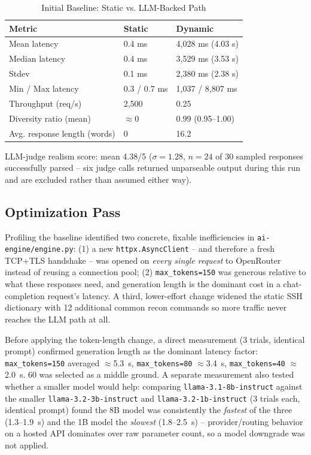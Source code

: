 \documentclass[conference]{IEEEtran}
\begin{document}
\begin{table}[htbp]
\caption{Initial Baseline: Static vs. LLM-Backed Path}
\label{tab:baseline}
\centering
\begin{tabular}{@{}lll@{}}
\toprule
\textbf{Metric} & \textbf{Static} & \textbf{Dynamic} \\
\midrule
Mean latency & 0.4 ms & 4{,}028 ms (4.03 s) \\
Median latency & 0.4 ms & 3{,}529 ms (3.53 s) \\
Stdev & 0.1 ms & 2{,}380 ms (2.38 s) \\
Min / Max latency & 0.3 / 0.7 ms & 1{,}037 / 8{,}807 ms \\
Throughput (req/s) & 2{,}500 & 0.25 \\
Diversity ratio (mean) & $\approx$0 & 0.99 (0.95--1.00) \\
Avg. response length (words) & 0 & 16.2 \\
\bottomrule
\end{tabular}
\end{table}

LLM-judge realism score: mean 4.38/5 ($\sigma = 1.28$, $n=24$ of 30 sampled
responses successfully parsed -- six judge calls returned unparseable output
during this run and are excluded rather than assumed either way).

\subsection{Optimization Pass}
\label{sec:optimization}

Profiling the baseline identified two concrete, fixable inefficiencies in
\texttt{ai-engine/engine.py}: (1) a new \texttt{httpx.AsyncClient} -- and
therefore a fresh TCP+TLS handshake -- was opened on \emph{every single
request} to OpenRouter instead of reusing a connection pool; (2)
\texttt{max\_tokens=150} was generous relative to what these responses
need, and generation length is the dominant cost in a chat-completion
request's latency. A third, lower-effort change widened the static SSH
dictionary with 12 additional common recon commands so more traffic never
reaches the LLM path at all.

Before applying the token-length change, a direct measurement (3 trials,
identical prompt) confirmed generation length as the dominant latency
factor: \texttt{max\_tokens=150} averaged $\approx$5.3~s,
\texttt{max\_tokens=80} $\approx$3.4~s, \texttt{max\_tokens=40}
$\approx$2.0~s. 60 was selected as a middle ground. A separate measurement
also tested whether a smaller model would help: comparing
\texttt{llama-3.1-8b-instruct} against the smaller
\texttt{llama-3.2-3b-instruct} and \texttt{llama-3.2-1b-instruct} (3 trials
each, identical prompt) found the 8B model was consistently the
\emph{fastest} of the three (1.3--1.9~s) and the 1B model the
\emph{slowest} (1.8--2.5~s) -- provider/routing behavior on a hosted API
dominates over raw parameter count, so a model downgrade was not applied.
\end{document}
